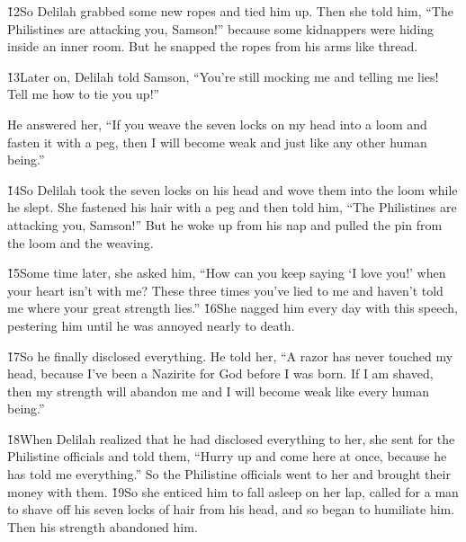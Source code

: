 \v{12}So Delilah grabbed some new ropes and tied him up. Then she told him, ``The Philistines are attacking you, Samson!'' because some kidnappers were hiding inside an inner room. But he snapped the ropes from his arms like thread.

\v{13}Later on, Delilah told Samson, ``You're still mocking me and telling me lies! Tell me how to tie you up!''

He answered her, ``If you weave the seven locks on my head into a loom and fasten it with a peg, then I will become weak and just like any other human being.''

\v{14}So Delilah took the seven locks on his head and wove them into the loom while he slept. She fastened his hair with a peg and then told him, ``The Philistines are attacking you, Samson!'' But he woke up from his nap and pulled the pin from the loom and the weaving.

\v{15}Some time later, she asked him, ``How can you keep saying `I love you!' when your heart isn't with me? These three times you've lied to me and haven't told me where your great strength lies.'' \v{16}She nagged him every day with this speech, pestering him until he was annoyed nearly to death.

\v{17}So he finally disclosed everything. He told her, ``A razor has never touched my head, because I've been a Nazirite for God before I was born. If I am shaved, then my strength will abandon me and I will become weak like every human being.''

\v{18}When Delilah realized that he had disclosed everything to her, she sent for the Philistine officials and told them, ``Hurry up and come here at once, because he has told me everything.'' So the Philistine officials went to her and brought their money with them. \v{19}So she enticed him to fall asleep on her lap, called for a man to shave off his seven locks of hair from his head, and so began to humiliate him. Then his strength abandoned him.

